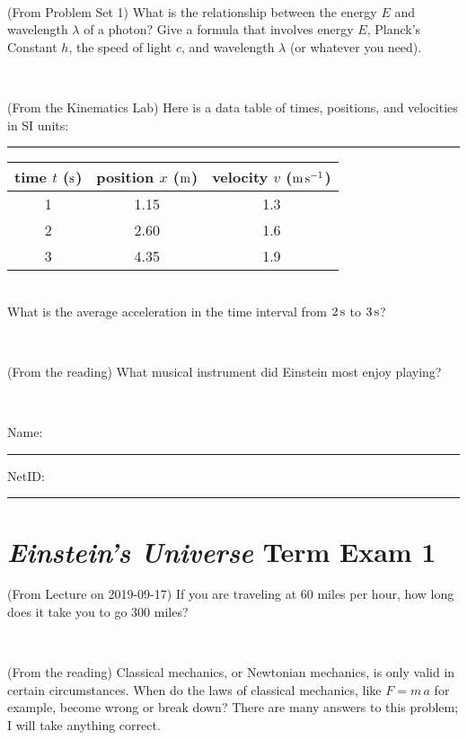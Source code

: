\documentclass[12pt, letterpaper]{article}
\begin{document}
\vfill ~

\begin{problem} (From Problem Set 1)
What is the relationship between the energy $E$ and wavelength
$\lambda$ of a photon? Give a formula that involves energy $E$,
Planck's Constant $h$, the speed of light $c$, and wavelength
$\lambda$ (or whatever you need).
\end{problem}

\vfill ~

\begin{problem} (From the Kinematics Lab)
Here is a data table of times, positions, and velocities in SI units:\\
\rule{1.0in}{0pt}\begin{tabular}{c|c|c}
time $t$ ($\mathrm{s}$) & position $x$ ($\mathrm{m}$) & velocity $v$ ($\mathrm{m}\,\mathrm{s}^{-1}$) \\
\hline
1 & 1.15 & 1.3 \\
2 & 2.60 & 1.6 \\
3 & 4.35 & 1.9 \\
\hline
\end{tabular}\\
What is the average acceleration in the time interval from $2\,\mathrm{s}$ to $3\,\mathrm{s}$?
\end{problem}


\vfill ~

\begin{problem} (From the reading)
What musical instrument did Einstein most enjoy playing?
\end{problem}


\vfill ~


\cleardoublepage



\noindent
Name: \rule[-1ex]{0.60\textwidth}{0.1pt}
NetID: \rule[-1ex]{0.20\textwidth}{0.1pt}

\section*{\textsl{Einstein's Universe} Term Exam 1}
\setcounter{problem}{1}


\begin{problem} (From Lecture on 2019-09-17)
If you are traveling at 60 miles per hour, how long does
it take you to go 300 miles?
\end{problem}


\vfill ~

\begin{problem} (From the reading)
Classical mechanics, or Newtonian mechanics, is only valid in certain
circumstances. When do the laws of classical mechanics, like $F =
m\,a$ for example, become wrong or break down? There are many answers
to this problem; I will take anything correct.
\end{problem}
\end{document}
